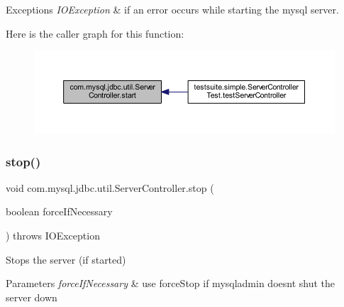 \begin{DoxyExceptions}{Exceptions}
{\em I\+O\+Exception} & if an error occurs while starting the mysql server. \\
\hline
\end{DoxyExceptions}
Here is the caller graph for this function\+:
\nopagebreak
\begin{figure}[H]
\begin{center}
\leavevmode
\includegraphics[width=350pt]{classcom_1_1mysql_1_1jdbc_1_1util_1_1_server_controller_aa6f82711f8bfe6c99c5bb1e89d5dd55f_icgraph}
\end{center}
\end{figure}
\mbox{\label{classcom_1_1mysql_1_1jdbc_1_1util_1_1_server_controller_a5a5c3f6222dbf1172ce2537456118925}} 
\subsubsection{\texorpdfstring{stop()}{stop()}}
{\footnotesize\ttfamily void com.\+mysql.\+jdbc.\+util.\+Server\+Controller.\+stop (\begin{DoxyParamCaption}\item[{boolean}]{force\+If\+Necessary }\end{DoxyParamCaption}) throws I\+O\+Exception}

Stops the server (if started)


\begin{DoxyParams}{Parameters}
{\em force\+If\+Necessary} & use force\+Stop if mysqladmin doesn\textquotesingle{}t shut the server down\\
\hline
\end{DoxyParams}

